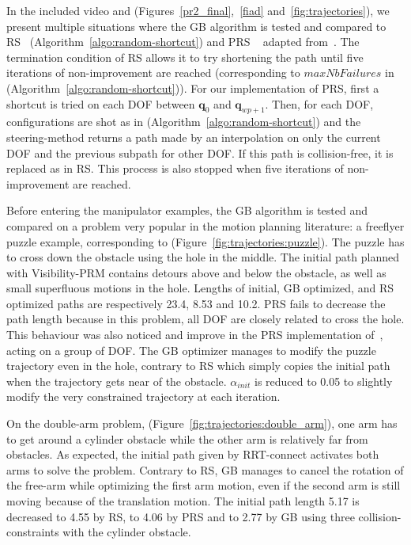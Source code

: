 \documentclass{tADR2e}
\newcommand\conf{\mathbf{q}}
\begin{document}
In the included video and (Figures~\ref{pr2_final},~\ref{fiad} 
and~\ref{fig:trajectories}), we present multiple situations where the GB algorithm 
is tested and compared to RS~\cite{randomShortcutHPP}
(Algorithm~\ref{algo:random-shortcut}) and PRS ~\cite{partialrandomShortcutHPP} 
adapted from~\cite{Geraerts04clearancebased}.
The termination condition of RS allows it to try 
shortening the path until five iterations of non-improvement are reached 
(corresponding to $maxNbFailures$ in (Algorithm~\ref{algo:random-shortcut})).
For our implementation of PRS, first a shortcut is tried on each DOF between 
$\conf_0$ and $\conf_{wp+1}$. 
Then, for each DOF, configurations are shot as in 
(Algorithm~\ref{algo:random-shortcut}) and the steering-method returns a path made by 
an interpolation on only 
the current DOF and the previous subpath for other DOF. If this path is 
collision-free, it is replaced as in RS. This process is also stopped when five 
iterations of non-improvement are reached.

\vspace{0.4cm}
Before entering the manipulator examples, the GB algorithm is tested and compared 
on a problem very popular in the motion planning literature: a freeflyer puzzle 
example, corresponding to (Figure~\ref{fig:trajectories:puzzle}).  The puzzle has to cross down the 
obstacle using the hole in the middle. The initial path planned with Visibility-PRM 
contains detours above and below the obstacle, as well as small superfluous
motions in the hole. 
Lengths of initial, GB optimized, and RS optimized paths are 
respectively 23.4, 8.53 and 10.2. PRS fails to decrease the path length because in 
this problem, all DOF are closely related to cross the hole. This behaviour was also 
noticed and improve in the PRS implementation of~\cite{Geraerts04clearancebased}, 
acting on a group of DOF. The GB optimizer manages to modify the puzzle trajectory 
even in the hole, contrary to RS which simply copies the initial path when the 
trajectory gets near of the obstacle. $\alpha_{init}$ is reduced to 0.05 to slightly modify the very constrained trajectory at each iteration.

\vspace{0.4cm}

On the double-arm problem, (Figure~\ref{fig:trajectories:double_arm}), one arm has 
to get around a cylinder obstacle while the 
other arm is relatively far from obstacles. As expected, the initial path given by 
RRT-connect activates both arms to solve the problem. Contrary to RS, 
GB manages to cancel the rotation of the free-arm while optimizing the 
first arm motion, even if the second arm is still moving because of the translation 
motion. The initial path length 5.17 is decreased to 4.55 by RS, to 4.06 by PRS and 
to 2.77 by GB using three collision-constraints with the cylinder obstacle.
\end{document}
